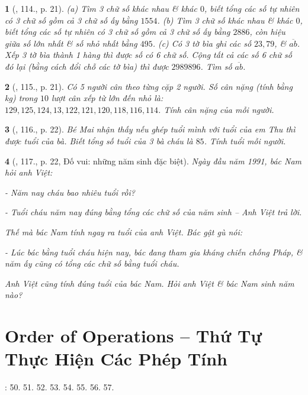 \documentclass{article}
\newtheorem{baitoan}{}
\begin{document}
\begin{baitoan}[\cite{Binh_Toan_6_tap_1}, 114., p. 21]
	(a) Tìm 3 chữ số khác nhau \& khác $0$, biết tổng các số tự nhiên có 3 chữ số gồm cả 3 chữ số ấy bằng $1554$. (b) Tìm 3 chữ số khác nhau \& khác $0$, biết tổng các số tự nhiên có 3 chữ số gồm cả 3 chữ số ấy bằng $2886$, còn hiệu giữa số lớn nhất \& số nhỏ nhất bằng $495$. (c) Có 3 tờ bìa ghi các số $23,79$, \& $\overline{ab}$. Xếp 3 tờ bìa thành 1 hàng thì được số có 6 chữ số. Cộng tất cả các số 6 chữ số đó lại (bằng cách đổi chỗ các tờ bìa) thì được $2989896$. Tìm số $\overline{ab}$.
\end{baitoan}

\begin{baitoan}[\cite{Binh_Toan_6_tap_1}, 115., p. 21]
	Có 5 người cân theo từng cặp 2 người. Số cân nặng (tính bằng {\rm kg}) trong $10$ lượt cân xếp từ lớn đến nhỏ là: $129,125,124,13,122,121,120,118,116,114$. Tính cân nặng của mỗi người.
\end{baitoan}

\begin{baitoan}[\cite{Binh_Toan_6_tap_1}, 116., p. 22]
	Bé Mai nhận thấy nếu ghép tuổi mình với tuổi của em Thu thì được tuổi của bà. Biết tổng số tuổi của 3 bà cháu là $85$. Tính tuổi mỗi người.
\end{baitoan}

\begin{baitoan}[\cite{Binh_Toan_6_tap_1}, 117., p. 22, Đố vui: những năm sinh đặc biệt]
	Ngày đầu năm 1991, bác Nam hỏi anh Việt:
	
	- Năm nay cháu bao nhiêu tuổi rồi?
	
	- Tuổi cháu năm nay đúng bằng tổng các chữ số của năm sinh -- Anh Việt trả lời.
	
	Thế mà bác Nam tính ngay ra tuổi của anh Việt. Bác gật gù nói:
	
	- Lúc bác bằng tuổi cháu hiện nay, bác đang tham gia kháng chiến chống Pháp, \& năm ấy cũng có tổng các chữ số bằng tuổi cháu.
	
	Anh Việt cũng tính đúng tuổi của bác Nam. Hỏi anh Việt \& bác Nam sinh năm nào?
\end{baitoan}


\section{Order of Operations -- Thứ Tự Thực Hiện Các Phép Tính}
\cite[\S6, pp. 20--21]{SBT_Toan_6_Canh_Dieu_tap_1}: 50. 51. 52. 53. 54. 55. 56. 57.
\end{document}
